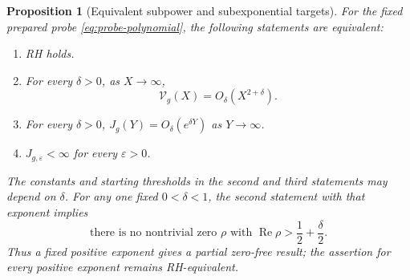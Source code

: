\documentclass[11pt]{article}
\numberwithin{equation}{section}
\newtheorem{proposition}[theorem]{Proposition}
\theoremstyle{definition}
\theoremstyle{remark}
\newcommand{\Rea}{\operatorname{Re}}
\begin{document}
\begin{proposition}[Equivalent subpower and subexponential targets]
\label{prop:selective-subpower}
For the fixed prepared probe \eqref{eq:probe-polynomial}, the
following statements are equivalent:
\begin{enumerate}
\item RH holds.
\item For every \(\delta>0\), as \(X\to\infty\),
\begin{equation}\label{eq:selective-subpower-variance}
\mathcal V_g(X)=O_\delta(X^{2+\delta}).
\end{equation}
\item For every \(\delta>0\),
\(J_g(Y)=O_\delta(e^{\delta Y})\) as \(Y\to\infty\).
\item \(J_{g,\varepsilon}<\infty\) for every \(\varepsilon>0\).
\end{enumerate}
The constants and starting thresholds in the second and third
statements may depend on \(\delta\). For any one fixed
\(0<\delta<1\), the second statement with that exponent implies
\begin{equation}\label{eq:selective-partial-zero-free}
\text{there is no nontrivial zero }\rho\text{ with }
\Rea\rho>\frac12+\frac\delta2.
\end{equation}
Thus a fixed positive exponent gives a partial zero-free result;
the assertion for every positive exponent remains RH-equivalent.
\end{proposition}
\end{document}
